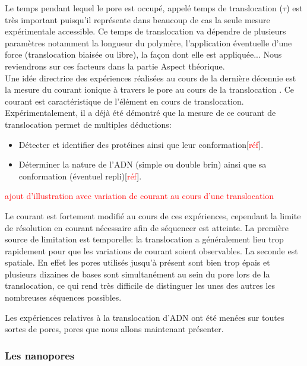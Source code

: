 \documentclass[a4paper,11pt]{article}
\begin{document}
Le temps pendant lequel le pore est occupé, appelé temps de translocation ($\tau$) est très important puisqu'il représente dans beaucoup de cas la seule mesure expérimentale accessible. Ce temps de translocation va dépendre de plusieurs paramètres notamment la longueur du polymère, l'application éventuelle d'une force (translocation biaisée ou libre), la façon dont elle est appliquée... Nous reviendrons sur ces facteurs dans la partie Aspect théorique.\\

 Une idée directrice des expériences réalisées au cours de la dernière décennie est la mesure du courant ionique à travers le pore au cours de la translocation \cite{holesedge}. Ce courant est caractéristique de l'élément en cours de translocation. Expérimentalement, il a déjà été démontré que la mesure de ce courant de translocation permet de multiples déductions:
 \begin{itemize}
 
 
 
 \item Détecter et identifier des protéines ainsi que leur conformation[\textcolor{red}{réf}].
 
  \item Déterminer la nature de l'ADN (simple ou double brin) ainsi que sa conformation (éventuel repli)[\textcolor{red}{réf}].
  
 \end{itemize}
 
 \textcolor{red}{ajout d'illustration avec variation de courant au cours d'une translocation}
 
Le courant est fortement modifié au cours de ces expériences, cependant la limite de résolution en courant nécessaire afin de séquencer est atteinte. La première source de limitation est temporelle: la translocation a généralement lieu trop rapidement pour que les variations de courant soient observables. La seconde est spatiale. En effet les pores utilisés jusqu'à présent sont bien trop épais et plusieurs dizaines de bases sont simultanément au sein du pore lors de la translocation, ce qui rend très difficile de distinguer les unes des autres les nombreuses séquences possibles.

Les expériences relatives à la translocation d'ADN ont été menées sur toutes sortes de pores, pores que nous allons maintenant présenter.
 
 

\subsubsection{Les nanopores}
\end{document}

